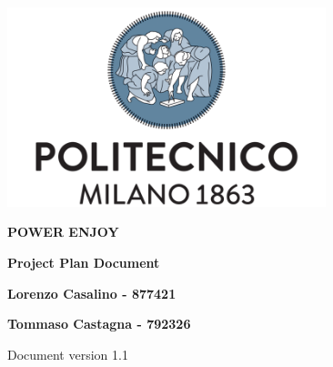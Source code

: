 \begin{titlepage}
        \begin{center}
                \includegraphics[width=350px]{../Datas/images/polimi.png}

                \vspace*{2.0cm}

                {\Huge \textbf{POWER ENJOY}\par}

                \vspace*{1.0cm}

                {\LARGE \textbf{Project Plan Document}\par}

                \vspace*{2.0cm}

                {\normalsize
                \textbf{Lorenzo Casalino - 877421}\par
                \textbf{Tommaso Castagna - 792326}\par
                }

                \vfill
                Document version 1.1
        \end{center}
\end{titlepage}
